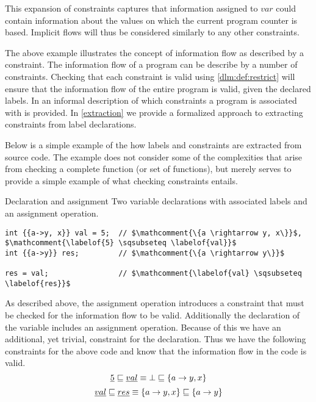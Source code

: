 This expansion of constraints captures that information assigned to $var$ could contain information about the values on which the current program counter is based.
Implicit flows will thus be considered similarly to any other constraints.

The above example illustrates the concept of information flow as described by a constraint.
The information flow of a program can be describe by a number of constraints.
Checking that each constraint is valid using \cref{dlm:def:restrict} will ensure that the information flow of the entire program is valid, given the declared labels.
In \cite{myers1997, myers1998, myers2000} an informal description of which constraints a program is associated with is provided.
In \cref{extraction} we provide a formalized approach to extracting constraints from label declarations.

Below is a simple example of the how labels and constraints are extracted from source code.
The example does not consider some of the complexities that arise from checking a complete function (or set of functions), but merely serves to provide a simple example of what checking constraints entails.

\begin{example}{Declaration and assignment}\label{dlm:ex:extract}
  Two variable declarations with associated labels and an assignment operation.

  \begin{lstlisting}[style=dlmc]
int {{a->y, x}} val = 5;  // $\mathcomment{\{a \rightarrow y, x\}}$, $\mathcomment{\labelof{5} \sqsubseteq \labelof{val}}$
int {{a->y}} res;         // $\mathcomment{\{a \rightarrow y\}}$

res = val;                // $\mathcomment{\labelof{val} \sqsubseteq \labelof{res}}$
  \end{lstlisting}

  As described above, the assignment operation introduces a constraint that must be checked for the information flow to be valid.
  Additionally the declaration of the  variable includes an assignment operation.
  Because of this we have an additional, yet trivial, constraint for the declaration.
  Thus we have the following constraints for the above code and know that the information flow in the code is valid.
  $$\underline{5} \sqsubseteq \underline{val} \equiv \bot \sqsubseteq \{a \rightarrow y, x\}$$
  $$\underline{val} \sqsubseteq \underline{res} \equiv \{a \rightarrow y, x\} \sqsubseteq \{a \rightarrow y\}$$
\end{example}

